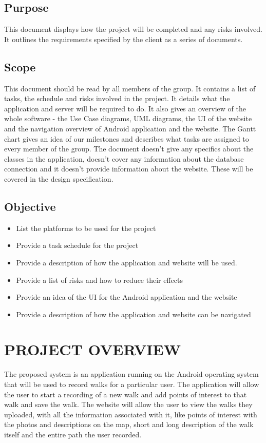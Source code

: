 \documentclass[12pt]{article}
\begin{document}
\subsection{Purpose}
This document displays how the project will be completed and any risks involved.  It outlines the requirements specified by the client as a series of documents.
\subsection{Scope}
This document should be read by all members of the group. It contains a list of tasks, the schedule and risks involved in the project. It details what the application and server will be required to do. It also gives an overview of the whole software - the Use Case diagrams, UML diagrams, the UI of the website and the navigation overview of Android application and the website. The Gantt chart gives an idea of our milestones and describes what tasks are assigned to every member of the group. The document doesn't give any specifics about the classes in the application, doesn't cover any information about the database connection and it doesn't provide information about the website. These will be covered in the design specification.
\subsection{Objective}
\begin{itemize}
\item List the platforms to be used for the project
\item Provide a task schedule for the project 
\item Provide a description of how the application and website will be used.
\item Provide a list of risks and how to reduce their effects
\item Provide an idea of the UI for the Android application and the website
\item Provide a description of how the application and website can be navigated
\end{itemize}
\newpage
\section{PROJECT OVERVIEW}
The proposed system is an application running on the Android operating system that will be used to record walks for a particular user. The application will allow the user to start a recording of a new walk and add points of interest to that walk and save the walk.
The website will allow the user to view the walks they uploaded, with all the information associated with it, like points of interest with the photos and descriptions on the map, short and long description of the walk itself and the entire path the user recorded.
\end{document}
